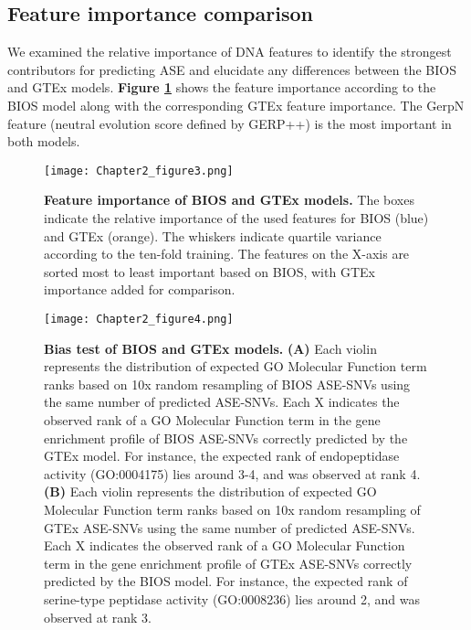 \documentclass{book}
\begin{document}
\begin{refsection}
\subsection*{Feature importance comparison}
We examined the relative importance of DNA features to identify the strongest contributors for predicting ASE and elucidate any differences between the BIOS and GTEx models.
\textbf{Figure \ref{fig:figure3}} shows the feature importance according to the BIOS model along with the corresponding GTEx feature importance.
The GerpN feature (neutral evolution score defined by GERP++) is the most important in both models.

\begin{landscape}
  \begin{figure}
  \texttt{[image: Chapter2\_figure3.png]}
  \caption{
    \label{fig:figure3} \textbf{Feature importance of BIOS and GTEx models.}
    The boxes indicate the relative importance of the used features for BIOS (blue) and GTEx (orange).
    The whiskers indicate quartile variance according to the ten-fold training.
    The features on the X-axis are sorted most to least important based on BIOS, with GTEx importance added for comparison.
  }
  \end{figure}
\end{landscape}

\begin{figure}[!bht]
  \texttt{[image: Chapter2\_figure4.png]}
  \caption{
    \label{fig:figure4} \textbf{Bias test of BIOS and GTEx models.}
    \textbf{(A)} Each violin represents the distribution of expected GO Molecular Function term ranks based on 10x random resampling of BIOS ASE-SNVs using the same number of predicted ASE-SNVs.
    Each X indicates the observed rank of a GO Molecular Function term in the gene enrichment profile of BIOS ASE-SNVs correctly predicted by the GTEx model.
    For instance, the expected rank of endopeptidase activity (GO:0004175) lies around 3-4, and was observed at rank 4.
    \textbf{(B)} Each violin represents the distribution of expected GO Molecular Function term ranks based on 10x random resampling of GTEx ASE-SNVs using the same number of predicted ASE-SNVs.
    Each X indicates the observed rank of a GO Molecular Function term in the gene enrichment profile of GTEx ASE-SNVs correctly predicted by the BIOS model.
    For instance, the expected rank of serine-type peptidase activity (GO:0008236) lies around 2, and was observed at rank 3.
  }
\end{figure}


\end{refsection}
\end{document}

